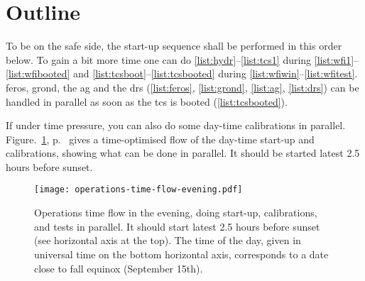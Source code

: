 \documentclass[11pt,fleqn]{book}
\def\figureref#1{Figure.~\ref{fig:#1}, p.~\pageref{fig:#1}}
\begin{document}
\section{Outline}
\label{sec:startupoutline}

To be on the safe side, the start-up sequence shall be performed in this order below. To gain a bit more time one can do \ref{list:hydr}--\ref{list:tcs1} during \ref{list:wfi1}--\ref{list:wfibooted} and
\ref{list:tcsboot}--\ref{list:tcsbooted} during
\ref{list:wfiwin}--\ref{list:wfitest}.  \gls{feros}, \gls{grond}, the \gls{ag} and the \gls{drs} (\ref{list:feros}, \ref{list:grond}, \ref{list:ag}, \ref{list:drs}) can be handled in parallel as soon as the \gls{tcs} is booted
(\ref{list:tcsbooted}).  

If under time pressure, you can also do some day-time calibrations in parallel. \figureref{timeflow-eve} gives a time-optimised flow of the day-time start-up and calibrations, showing what can be done in parallel.  It should be started latest 2.5 hours before sunset.
\begin{figure}
\texttt{[image: operations-time-flow-evening.pdf]}
\caption{Operations time flow in the evening, doing start-up, calibrations, and tests in parallel.  It should start latest 2.5 hours before sunset (see horizontal axis at the top).  The time of the day, given in universal time on the bottom horizontal axis, corresponds to a date close to fall equinox (September 15th).}
\label{fig:timeflow-eve}
\end{figure}
\end{document}
